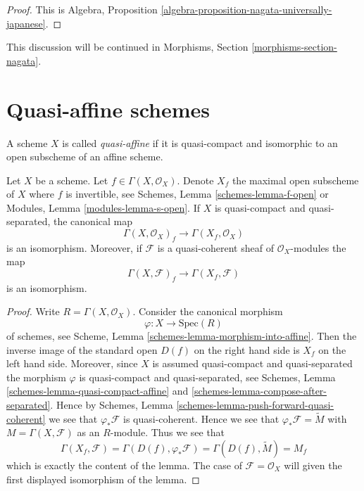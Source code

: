 \begin{proof}
This is
Algebra, Proposition \ref{algebra-proposition-nagata-universally-japanese}.
\end{proof}

\noindent
This discussion will be continued in
Morphisms, Section \ref{morphisms-section-nagata}.



\section{Quasi-affine schemes}
\label{section-quasi-affine}

\begin{definition}
\label{definition-quasi-affine}
A scheme $X$ is called {\it quasi-affine} if it is quasi-compact
and isomorphic to an open subscheme of an affine scheme.
\end{definition}

\begin{lemma}
\label{lemma-invert-f-sections}
Let $X$ be a scheme. Let $f \in \Gamma(X, \mathcal{O}_X)$.
Denote $X_f$ the maximal open subscheme of $X$ where $f$ is invertible, see
Schemes, Lemma \ref{schemes-lemma-f-open} or
Modules, Lemma \ref{modules-lemma-s-open}.
If $X$ is quasi-compact and quasi-separated, the canonical map
$$
\Gamma(X, \mathcal{O}_X)_f \longrightarrow \Gamma(X_f, \mathcal{O}_X)
$$
is an isomorphism. Moreover, if $\mathcal{F}$ is a quasi-coherent
sheaf of $\mathcal{O}_X$-modules the map
$$
\Gamma(X, \mathcal{F})_f \longrightarrow \Gamma(X_f, \mathcal{F})
$$
is an isomorphism.
\end{lemma}

\begin{proof}
Write $R = \Gamma(X, \mathcal{O}_X)$.
Consider the canonical morphism
$$
\varphi : X \longrightarrow \text{Spec}(R)
$$
of schemes, see
Scheme, Lemma \ref{schemes-lemma-morphism-into-affine}.
Then the inverse image of the standard open $D(f)$ on the
right hand side is $X_f$ on the left hand side.
Moreover, since $X$ is assumed quasi-compact and quasi-separated
the morphism $\varphi$ is quasi-compact and quasi-separated,
see Schemes, Lemma \ref{schemes-lemma-quasi-compact-affine} and
\ref{schemes-lemma-compose-after-separated}. Hence by
Schemes, Lemma \ref{schemes-lemma-push-forward-quasi-coherent}
we see that $\varphi_*\mathcal{F}$ is quasi-coherent.
Hence we see that $\varphi_*\mathcal{F} = \widetilde M$
with $M = \Gamma(X, \mathcal{F})$ as an $R$-module.
Thus we see that
$$
\Gamma(X_f, \mathcal{F}) =
\Gamma(D(f), \varphi_*\mathcal{F}) =
\Gamma(D(f), \widetilde M) = M_f
$$
which is exactly the content of the lemma. The case of
$\mathcal{F} = \mathcal{O}_X$ will given the first displayed isomorphism
of the lemma.
\end{proof}

